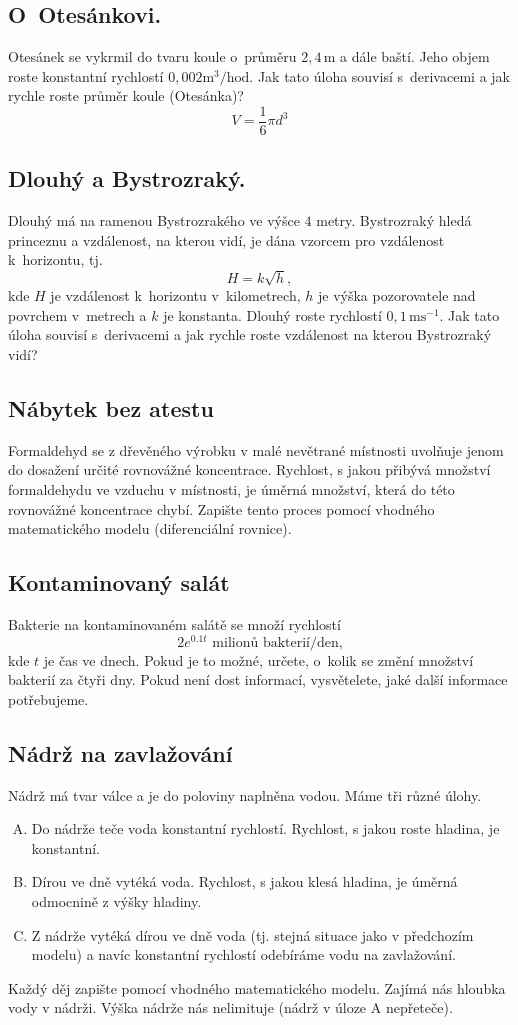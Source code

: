 \subsection{O Otesánkovi.}
Otesánek se vykrmil do tvaru koule o průměru $2{,}4\,\mathrm{m}$ a dále baští. Jeho objem roste konstantní rychlostí $0{,}002 \mathrm{m}^3/\mathrm{hod}$. Jak tato úloha souvisí s derivacemi a jak rychle roste průměr koule (Otesánka)? $$V=\frac 16 \pi d^3$$

\subsection{Dlouhý a Bystrozraký.} Dlouhý má na ramenou Bystrozrakého ve výšce $4$ metry. Bystrozraký hledá princeznu a vzdálenost, na kterou vidí, je dána vzorcem pro vzdálenost k horizontu, tj. $$H=k\sqrt {h},$$ kde $H$ je vzdálenost k horizontu v kilometrech, $h$ je výška pozorovatele nad povrchem  v metrech  a $k$ je konstanta.
  Dlouhý roste rychlostí $0{,}1\,\mathrm{m} \mathrm{s}^{-1}$.
Jak tato úloha souvisí s derivacemi a jak rychle roste vzdálenost na kterou Bystrozraký vidí?

\subsection{Nábytek bez atestu}

Formaldehyd se z dřevěného výrobku v malé nevětrané místnosti uvolňuje jenom do dosažení určité rovnovážné koncentrace. Rychlost, s jakou přibývá množství formaldehydu ve vzduchu v místnosti, je úměrná množství, která do této rovnovážné koncentrace chybí. Zapište tento proces pomocí vhodného matematického modelu (diferenciální rovnice).

\subsection{Kontaminovaný salát} Bakterie na kontaminovaném salátě se množí rychlostí  $$2e^{0.1t}\text{ milionů bakterií/den,}$$  kde $t$ je čas ve dnech. Pokud je to možné, určete, o~kolik se změní množství bakterií za čtyři dny. Pokud není dost informací, vysvětelete, jaké další informace potřebujeme.


\subsection{Nádrž na zavlažování}

Nádrž má tvar válce a je do poloviny naplněna vodou. Máme tři různé úlohy.
\begin{enumerate}[(A)] pt
\item Do nádrže teče voda konstantní rychlostí. Rychlost, s jakou roste hladina, je konstantní.
\item Dírou ve dně vytéká voda. Rychlost, s jakou klesá hladina, je úměrná odmocnině z výšky hladiny.
\item Z nádrže vytéká dírou ve dně voda (tj. stejná situace jako v předchozím modelu) a navíc konstantní rychlostí odebíráme vodu na zavlažování.
\end{enumerate}
Každý děj zapište pomocí
vhodného matematického modelu. Zajímá nás
hloubka vody v nádrži. Výška nádrže nás
nelimituje (nádrž v úloze A nepřeteče).


